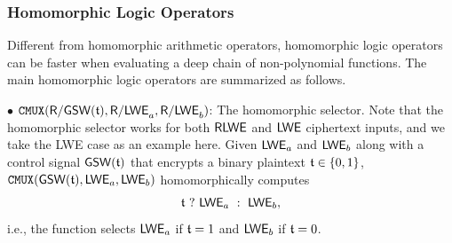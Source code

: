 



\subsubsection{Homomorphic Logic Operators}
Different from homomorphic arithmetic operators,
homomorphic logic  operators can be faster
when evaluating a deep chain of non-polynomial functions. The main
homomorphic logic operators are summarized as follows.

$\bullet$ $\texttt{CMUX}({\mathsf{R}/\mathsf{GSW}}({\mathfrak{t}}), {\mathsf{R}/\mathsf{LWE}}_{a}, {\mathsf{R}/\mathsf{LWE}}_{b})$: 
The homomorphic selector. Note that the homomorphic selector works for
both ${\mathsf{RLWE}}$ and ${\mathsf{LWE}}$ ciphertext inputs, and we take the LWE case as an
example here.
Given ${\mathsf{LWE}}_a$ and ${\mathsf{LWE}}_b$
along with a control signal ${\mathsf{GSW}}(\mathfrak{t})$
that encrypts a binary 
plaintext ${\mathfrak{t}} \in \{0,1\}$, 
$\texttt{CMUX}({\mathsf{GSW}}({\mathfrak{t}}), {\mathsf{LWE}}_a, {\mathsf{LWE}}_b)$ homomorphically computes
\begin{align}\label{eq:cmux}
{\mathfrak{t}}\text{ }?\text{ }{\mathsf{LWE}}_a\text{ }:\text{ }{\mathsf{LWE}}_b,
\end{align}
i.e., the function selects ${\mathsf{LWE}}_a$ if ${\mathfrak{t}}=1$ and ${\mathsf{LWE}}_b$
if ${\mathfrak{t}}=0$. 

